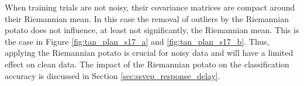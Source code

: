 When training trials are not noisy, their covariance matrices are compact around their Riemannian mean. 
In this case the removal of outliers by the Riemannian potato does not influence, at least not significantly, the Riemannian mean. 
This is the case in Figure \ref{fig:tan_plan_s17_a} and \ref{fig:tan_plan_s17_b}.
Thus, applying the Riemannian potato is crucial for noisy data and will have a limited effect on clean data.
The impact of the Riemannian potato on the classification accuracy is discussed in Section \ref{sec:ssvep_response_delay}. 

\begin{figure}[hb!]
\begin{adjustbox}{center}
\end{adjustbox}


\end{figure}
